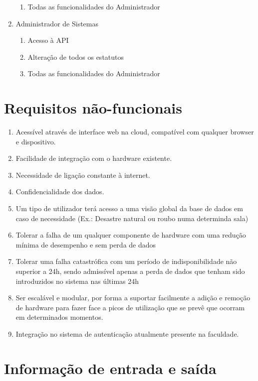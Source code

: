 \documentclass[a4paper]{report}
\begin{document}
\begin{enumerate}
\begin{enumerate}
    \item Todas as funcionalidades do Administrador
	\end{enumerate}
\item Administrador de Sistemas
	\begin{enumerate}
    \item Acesso à API
    \item Alteração de todos os estatutos
    \item Todas as funcionalidades do Administrador
    \end{enumerate}
\end{enumerate}
\section{Requisitos não-funcionais}
\begin{enumerate}
\item Acessível através de interface web na cloud, compatível com qualquer browser e dispositivo.
\item Facilidade de integração com o hardware existente.
\item Necessidade de ligação constante à internet.
\item Confidencialidade dos dados.
\item Um tipo de utilizador terá acesso a uma visão global da base de dados em caso de necessidade (Ex.: Desastre natural ou roubo numa determinda sala)
\item Tolerar a falha de um qualquer componente de hardware com uma redução mínima de desempenho e sem perda de dados
\item Tolerar uma falha catastrófica com um período de indisponibilidade não superior a 24h, sendo admissível apenas a perda de dados que tenham sido introduzidos no sistema nas últimas 24h
\item Ser escalável e modular, por forma a suportar facilmente a adição e remoção de hardware para fazer face a picos de utilização que se prevê que ocorram em determinados momentos.
\item Integração no sistema de autenticação atualmente presente na faculdade.
\end{enumerate}
\section{Informação de entrada e saída}
\end{document}
